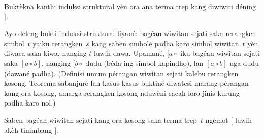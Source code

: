 \documentclass[../../../include/open-logic-section]{subfiles}
\begin{document}
\begin{prob}
  Buktèkna kanthi induksi
  struktural yèn ora ana
  terma trep kang diwiwiti
  déning~$]$.
\end{prob}

Ayo deleng bukti induksi
struktural liyané: bagéan
wiwitan sejati saka rerangken
simbol~$t$ yaiku rerangken~$s$ kang saben
simbolé padha karo simbol
wiwitan~$t$ yèn diwaca
saka kiwa, nanging $t$
luwih dawa. Upamané,
$[a \circ {}$ iku bagéan
wiwitan sejati saka
$[a \circ b]$, nanging
$[b \circ {}$ dudu
(béda ing simbol kapindho),
lan $[a
\circ b]$ uga dudu
(dawané padha).
(Definisi umum pérangan wiwitan sejati kalebu rerangken kosong. Teorema sabanjuré lan kasus-kasus buktiné diwatesi marang pérangan kang ora kosong, amarga rerangken kosong nduwèni cacah loro jinis kurung padha karo nol.)

\begin{prop}
  Saben bagéan wiwitan sejati
  kang ora kosong saka terma
  trep~$t$ ngemot $[$ luwih
  akèh tinimbang $]$.
\end{prop}
\end{document}
